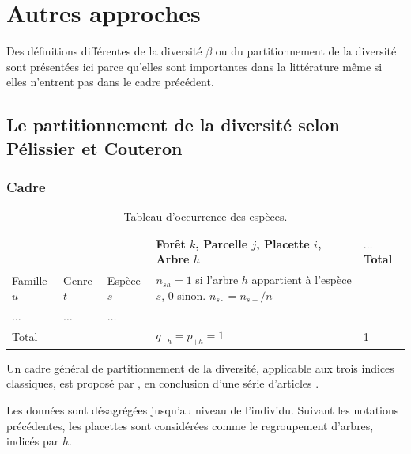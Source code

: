 \documentclass[
  11pt,
  french,
  a4paper,
  extrafontsizes,onecolumn,openright
  ]{memoir}
\begin{document}
\chapter{Autres approches}\label{sec-betaAutres}

Des définitions différentes de la diversité \(\beta\) ou du partitionnement de la diversité sont présentées ici parce qu'elles sont importantes dans la littérature même si elles n'entrent pas dans le cadre précédent.

\section{Le partitionnement de la diversité selon Pélissier et Couteron}\label{le-partitionnement-de-la-diversituxe9-selon-puxe9lissier-et-couteron}

\subsection{Cadre}\label{sec-PCcadre}



\scriptsize

\begin{table}
\centering
\caption{\label{tab:Couteron}Tableau d'occurrence des espèces.}
\centering
\fontsize{8}{10}\selectfont
\begin{tabu} to 
\toprule
 &  &  & Forêt $k$, Parcelle $j$, Placette $i$, Arbre $h$ & $\dots$ Total\\
\midrule
Famille $u$ & Genre $t$ & Espèce $s$ & $n_{sh}=1$ si l'arbre $h$ appartient à l'espèce $s$, $0$ sinon. $n_{s\cdot}={n_{s+}}/{n}$ & \\
$\dots$ & $\dots$ & $\dots$ &  & \\
Total &  &  & $q_{+h}=p_{+h}=1$ & 1\\
\bottomrule
\end{tabu}
\end{table}

\normalsize

Un cadre général de partitionnement de la diversité, applicable aux trois indices classiques, est proposé par \textcite{Pelissier2007}, en conclusion d'une série d'articles \autocite{Pelissier2003,Couteron2004}.

Les données sont désagrégées jusqu'au niveau de l'individu.
Suivant les notations précédentes, les placettes sont considérées comme le regroupement d'arbres, indicés par \(h\).
\end{document}
